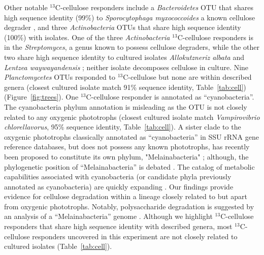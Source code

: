 Other notable $^{13}$C-cellulose responders include a \textit{Bacteroidetes}
OTU that shares high sequence identity (99\%) to \textit{Sporocytophaga
myxococcoides} a known cellulose degrader \citep{Vance_1980}, and three
\textit{Actinobacteria} OTUs that share high sequence identity (100\%) with
isolates. One of the three \textit{Actinobacteria}
$^{13}$C-cellulose responders is in the \textit{Streptomyces}, a genus known to
possess cellulose degraders, while the other two share high sequence identity
to cultured isolates \textit{Allokutzneriz albata} \citep{Labeda_2008,
Tomita_1993} and \textit{Lentzea waywayandensis} \citep{LABEDA_1989,
Labeda_2001}; neither isolate decomposes cellulose in culture. Nine
\textit{Planctomycetes} OTUs responded to $^{13}$C-cellulose but none are within
described genera (closest cultured isolate match 91\% sequence identity,
Table~\ref{tab:cell}) (Figure~\ref{fig:trees}). One
$^{13}$C-cellulose responder is annotated as ``cyanobacteria''.
The cyanobacteria phylum annotation is misleading as the OTU is not closely
related to any oxygenic phototrophs (closest cultured isolate match
\textit{Vampirovibrio chlorellavorus}, 95\% sequence identity,
Table~\ref{tab:cell}). A sister clade to the oxygenic phototrophs classically
annotated as ``cyanobacteria'' in SSU rRNA gene reference databases, but does
not possess any known phototrophs, has recently been proposed to constitute its own
phylum, "Melainabacteria" \citet{Di_Rienzi_2013}; although, the phylogenetic
position of ``Melainabacteria'' is debated \citep{Soo_2014}. The catalog of
metabolic capabilities associated with cyanobacteria (or candidate phyla
previously annotated as cyanobacteria) are quickly expanding
\citep{Di_Rienzi_2013, Soo_2014}. Our findings provide evidence for cellulose
degradation within a lineage closely related to but apart from oxygenic
phototrophs. Notably, polysaccharide degradation is suggested by an analysis of
a ``Melainabacteria'' genome \citep{Di_Rienzi_2013}. Although we highlight
$^{13}$C-cellulose responders that share high sequence identity with described
genera, most $^{13}$C-cellulose responders uncovered in this experiment are not
closely related to cultured isolates (Table~\ref{tab:cell}).

